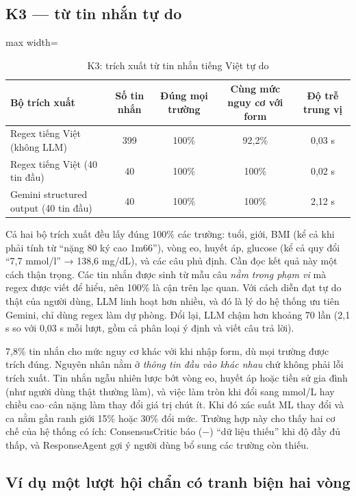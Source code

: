 \subsection{K3 — từ tin nhắn tự do}

\begin{table}[H]
\centering
\caption{K3: trích xuất từ tin nhắn tiếng Việt tự do}
\label{tab:k3}
\small
\begin{adjustbox}{max width=\linewidth}
\begin{tabular}{@{}lcccc@{}}
\toprule
\textbf{Bộ trích xuất} & \textbf{Số tin nhắn} & \textbf{Đúng mọi trường} & \textbf{Cùng mức nguy cơ với form} & \textbf{Độ trễ trung vị} \\
\midrule
Regex tiếng Việt (không LLM) & 399 & 100\% & 92,2\% & 0,03 s \\
Regex tiếng Việt (40 tin đầu) & 40 & 100\% & 100\% & 0,02 s \\
Gemini structured output (40 tin đầu) & 40 & 100\% & 100\% & 2,12 s \\
\bottomrule
\end{tabular}
\end{adjustbox}
\end{table}

Cả hai bộ trích xuất đều lấy đúng 100\% các trường: tuổi, giới, BMI (kể cả khi phải tính từ ``nặng 80 ký cao 1m66''), vòng eo, huyết áp, glucose (kể cả quy đổi ``7,7 mmol/l'' → 138,6 mg/dL), và các câu phủ định. Cần đọc kết quả này một cách thận trọng. Các tin nhắn được sinh từ mẫu câu \emph{nằm trong phạm vi} mà regex được viết để hiểu, nên 100\% là cận trên lạc quan. Với cách diễn đạt tự do thật của người dùng, LLM linh hoạt hơn nhiều, và đó là lý do hệ thống ưu tiên Gemini, chỉ dùng regex làm dự phòng. Đổi lại, LLM chậm hơn khoảng 70 lần (2,1 s so với 0,03 s mỗi lượt, gồm cả phân loại ý định và viết câu trả lời).

7,8\% tin nhắn cho mức nguy cơ khác với khi nhập form, dù mọi trường được trích đúng. Nguyên nhân nằm ở \emph{thông tin đầu vào khác nhau} chứ không phải lỗi trích xuất. Tin nhắn ngẫu nhiên lược bớt vòng eo, huyết áp hoặc tiền sử gia đình (như người dùng thật thường làm), và việc làm tròn khi đổi sang mmol/L hay chiều cao–cân nặng làm thay đổi giá trị chút ít. Khi đó xác suất ML thay đổi và ca nằm gần ranh giới 15\% hoặc 30\% đổi mức. Trường hợp này cho thấy hai cơ chế của hệ thống có ích: ConsensusCritic báo (−) ``dữ liệu thiếu'' khi độ đầy đủ thấp, và ResponseAgent gợi ý người dùng bổ sung các trường còn thiếu.

\subsection{Ví dụ một lượt hội chẩn có tranh biện hai vòng}

